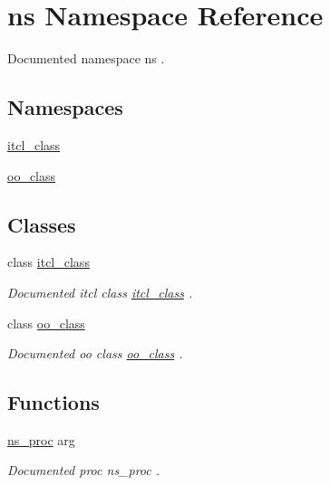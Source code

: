 \hypertarget{namespacens}{}\section{ns Namespace Reference}
\label{namespacens}


Documented namespace {\ttfamily ns} .  


\subsection*{Namespaces}
\begin{DoxyCompactItemize}
\item 
 \mbox{\hyperlink{namespacens_1_1itcl__class}{itcl\+\_\+class}}
\item 
 \mbox{\hyperlink{namespacens_1_1oo__class}{oo\+\_\+class}}
\end{DoxyCompactItemize}
\subsection*{Classes}
\begin{DoxyCompactItemize}
\item 
class \mbox{\hyperlink{classns_1_1itcl__class}{itcl\+\_\+class}}
\begin{DoxyCompactList}\small\item\em Documented itcl class {\ttfamily \mbox{\hyperlink{classns_1_1itcl__class}{itcl\+\_\+class}}} . \end{DoxyCompactList}\item 
class \mbox{\hyperlink{classns_1_1oo__class}{oo\+\_\+class}}
\begin{DoxyCompactList}\small\item\em Documented oo class {\ttfamily \mbox{\hyperlink{classns_1_1oo__class}{oo\+\_\+class}}} . \end{DoxyCompactList}\end{DoxyCompactItemize}
\subsection*{Functions}
\begin{DoxyCompactItemize}
\item 
\mbox{\hyperlink{namespacens_a1429cbe84d32b17ea4783e5c5c00615b}{ns\+\_\+proc}} arg
\begin{DoxyCompactList}\small\item\em Documented proc {\ttfamily ns\+\_\+proc} . \end{DoxyCompactList}\end{DoxyCompactItemize}
